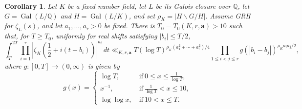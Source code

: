 \documentclass[twoside,reqno,11pt,a4paper]{amsart}
\numberwithin{equation}{section}
\theoremstyle{plain}
\newtheorem{cor}[thm]{Corollary}
\theoremstyle{definition}
\theoremstyle{remark}
\DeclareMathOperator{\Gal}{Gal}
\renewcommand{\le}{\leqslant}
\renewcommand{\ge}{\geqslant}
\begin{document}
\begin{cor}\label{galois-shifted-corollary}
Let $K$ be a fixed number field, let $L$ be its Galois closure over $\mathbb Q$, let $G=\Gal(L/\mathbb Q)$ and $H=\Gal(L/K)$, and set $\rho_K=|H\backslash G/H|$. Assume GRH for $\zeta_L(s)$, and let $a_1,\ldots,a_r>0$ be fixed. There is $T_0=T_0(K,r,\mathbf a)>10$ such that, for $T\ge T_0$, uniformly for real shifts satisfying $|b_i|\le T/2$,
\begin{equation*}
\int_T^{2T}\prod_{i=1}^{r}
\left|\zeta_K\left(\frac12+i(t+b_i)\right)\right|^{a_i}\,dt
\ll_{K,r,\mathbf a} T(\log T)^{\rho_K(a_1^2+\cdots+a_{r}^2)/4}
\prod_{1\le  i<j\le  r}
g(|b_i-b_j|)^{\rho_K a_i a_j/2},
\end{equation*}
where $g:[0,T]\to(0,\infty)$ is given by
\begin{equation*}
			g(x)= \begin{cases}
				\log T, \ & \text{if} \ 0\le x\le \frac{1}{\log T},\\
				x^{-1}, \ & \text{if} \ \frac{1}{\log T}<x\le 10,\\
				\log\log x, \ & \text{if}\ 10<x\le T.
			\end{cases}
\end{equation*}
\end{cor}
\end{document}
